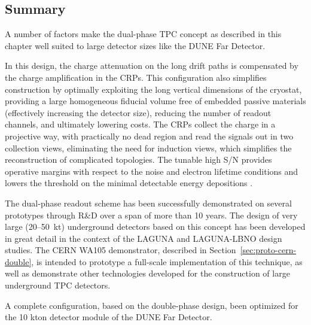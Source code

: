 \subsection{Summary}

A number of factors make the dual-phase TPC concept as described in this chapter 
well suited to large detector sizes like the DUNE Far Detector.

In this design, the charge attenuation on the long drift paths is compensated by the
charge amplification in the CRPs.  This configuration also simplifies
construction by optimally exploiting the long vertical dimensions of
the cryostat, providing a large homogeneous fiducial volume 
free of embedded passive materials (effectively increasing the detector size),
reducing the number of readout channels,  and ultimately lowering costs.  
The CRPs collect the charge in a projective way,  with practically no dead region and read the signals out 
in two collection views, eliminating the need for  induction views, which 
simplifies the reconstruction of complicated topologies. The tunable high S/N provides operative margins
with respect to the noise and electron lifetime conditions and lowers the threshold on the minimal
detectable energy depositions .

The dual-phase readout scheme has been successfully demonstrated on
several prototypes through R\&D over a span of more than 10 years.  The
design of very large (20--50~kt) underground detectors based on this
concept has been developed in great detail in the context of the
LAGUNA and LAGUNA-LBNO design studies.  The CERN WA105 demonstrator, 
described in Section~\ref{sec:proto-cern-double}, is intended to prototype 
a full-scale implementation of this technique, as
well as demonstrate other technologies developed for the construction of large
underground TPC detectors.  

 A complete configuration, based on the double-phase design, been optimized for the 10 kton
detector module of the DUNE Far Detector.